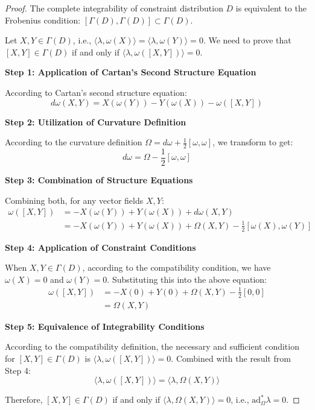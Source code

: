 \documentclass[a4paper,12pt]{extarticle}
\theoremstyle{definition}
\begin{document}
\begin{proof}
The complete integrability of constraint distribution $D$ is equivalent to the Frobenius condition: $[\Gamma(D), \Gamma(D)] \subset \Gamma(D)$.

Let $X, Y \in \Gamma(D)$, i.e., $\langle\lambda, \omega(X)\rangle = \langle\lambda, \omega(Y)\rangle = 0$. We need to prove that $[X, Y] \in \Gamma(D)$ if and only if $\langle\lambda, \omega([X, Y])\rangle = 0$.

\textbf{Step 1: Application of Cartan's Second Structure Equation}

According to Cartan's second structure equation:
$$d\omega(X, Y) = X(\omega(Y)) - Y(\omega(X)) - \omega([X, Y])$$

\textbf{Step 2: Utilization of Curvature Definition}

According to the curvature definition $\Omega = d\omega + \frac{1}{2}[\omega, \omega]$, we transform to get:
$$d\omega = \Omega - \frac{1}{2}[\omega, \omega]$$

\textbf{Step 3: Combination of Structure Equations}

Combining both, for any vector fields $X, Y$:
\begin{align}
\omega([X, Y]) &= -X(\omega(Y)) + Y(\omega(X)) + d\omega(X, Y)\\
&= -X(\omega(Y)) + Y(\omega(X)) + \Omega(X, Y) - \frac{1}{2}[\omega(X), \omega(Y)]
\end{align}

\textbf{Step 4: Application of Constraint Conditions}

When $X, Y \in \Gamma(D)$, according to the compatibility condition, we have $\omega(X) = 0$ and $\omega(Y) = 0$. Substituting this into the above equation:
\begin{align}
\omega([X, Y]) &= -X(0) + Y(0) + \Omega(X, Y) - \frac{1}{2}[0, 0]\\
&= \Omega(X, Y)
\end{align}

\textbf{Step 5: Equivalence of Integrability Conditions}

According to the compatibility definition, the necessary and sufficient condition for $[X, Y] \in \Gamma(D)$ is $\langle\lambda, \omega([X, Y])\rangle = 0$. Combined with the result from Step 4:
$$\langle\lambda, \omega([X, Y])\rangle = \langle\lambda, \Omega(X, Y)\rangle$$

Therefore, $[X, Y] \in \Gamma(D)$ if and only if $\langle\lambda, \Omega(X, Y)\rangle = 0$, i.e., $\text{ad}_\Omega^* \lambda = 0$.
\end{proof}
\end{document}
